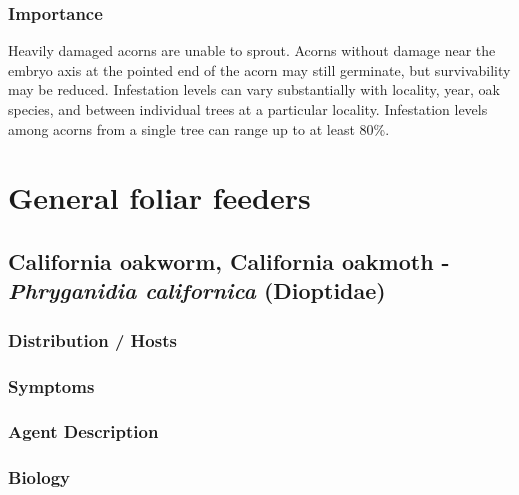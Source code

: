 \documentclass[
]{book}
\begin{document}
\subsection*{Importance}\label{importance-1}

Heavily damaged acorns are unable to sprout. Acorns without damage near the embryo axis at the pointed end of the acorn may still germinate, but survivability may be reduced. Infestation levels can vary substantially with locality, year, oak species, and between individual trees at a particular locality. Infestation levels among acorns from a single tree can range up to at least 80\%.

\chapter{General foliar feeders}\label{foliarfeeder}

\section*{\texorpdfstring{California oakworm, California oakmoth - \emph{Phryganidia californica} (Dioptidae)}{California oakworm, California oakmoth - Phryganidia californica (Dioptidae)}}\label{california-oakworm-california-oakmoth---phryganidia-californica-dioptidae}

\subsection*{Distribution / Hosts}\label{distribution-hosts-2}

\subsection*{Symptoms}\label{symptoms-2}

\subsection*{Agent Description}\label{agent-description-2}

\subsection*{Biology}\label{biology-2}
\end{document}
